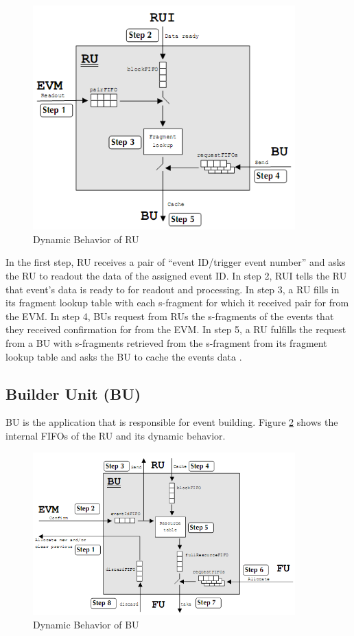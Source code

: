 \begin{figure}
	\centering
		\includegraphics[width=0.90\textwidth]{figures/ru.png}
	\caption{Dynamic Behavior of RU}
	\label{fig:ru}
\end{figure}

In the first step, RU receives a pair of ``event ID/trigger event number'' and asks the RU to readout the data of the assigned event ID. In step 2, RUI tells the RU that event's data is ready to for readout and processing. In step 3, a RU fills in its fragment lookup table with each s-fragment for which it received pair for from the EVM. In step 4, BUs request from RUs the s-fragments of the events that they received confirmation for from the EVM. In step 5, a RU fulfills the request from a BU with s-fragments retrieved from the s-fragment from its fragment lookup table and asks the BU to cache the events data \cite{rubuilder}.

\subsection{Builder Unit (BU)}

BU is the application that is responsible for event building. Figure \ref{fig:bu} shows the internal FIFOs of the RU and its dynamic behavior.

\begin{figure}
	\centering
		\includegraphics[width=0.90\textwidth]{figures/bu.png}
	\caption{Dynamic Behavior of BU}
	\label{fig:bu}
\end{figure}

